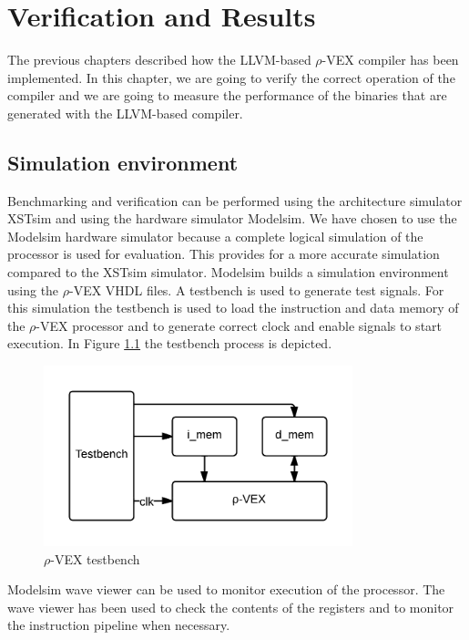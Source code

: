 \chapter{Verification and Results}
\label{chap:results}
The previous chapters described how the LLVM-based $\rho$-VEX compiler has been implemented. In this chapter, we are going to verify the correct operation of the compiler and we are going to measure the performance of the binaries that are generated with the LLVM-based compiler.

\section{Simulation environment}

Benchmarking and verification can be performed using the architecture simulator XSTsim and using the hardware simulator Modelsim. We have chosen to use the Modelsim hardware simulator because a complete logical simulation of the processor is used for evaluation. This provides for a more accurate simulation compared to the XSTsim simulator. Modelsim builds a simulation environment using the $\rho$-VEX VHDL files. A testbench is used to generate test signals. For this simulation the testbench is used to load the instruction and data memory of the $\rho$-VEX processor and to generate correct clock and enable signals to start execution. In Figure \ref{fig:rvex_tb} the testbench process is depicted.

\begin{figure}[ht]
\centering
\includegraphics[width=0.8\textwidth]{5_results/img/testbench.png}
\caption{$\rho$-VEX testbench}
\label{fig:rvex_tb}
\end{figure}

Modelsim wave viewer can be used to monitor execution of the processor. The wave viewer has been used to check the contents of the registers and to monitor the instruction pipeline when necessary.

